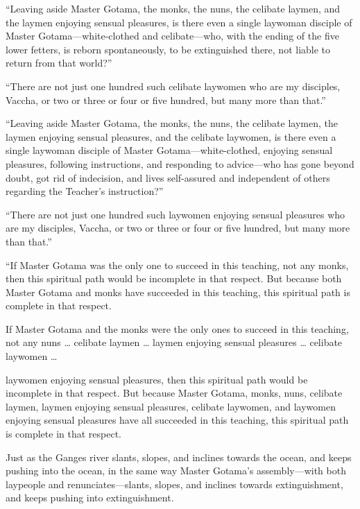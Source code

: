 \documentclass[12pt,openany]{book}%
\begin{document}
“Leaving aside Master Gotama, the monks, the nuns, the celibate laymen, and the laymen enjoying sensual pleasures, is there even a single laywoman disciple of Master Gotama—white-clothed and celibate—who, with the ending of the five lower fetters, is reborn spontaneously, to be extinguished there, not liable to return from that world?” 

“There are not just one hundred such celibate laywomen who are my disciples, Vaccha, or two or three or four or five hundred, but many more than that.” 

“Leaving aside Master Gotama, the monks, the nuns, the celibate laymen, the laymen enjoying sensual pleasures, and the celibate laywomen, is there even a single laywoman disciple of Master Gotama—white-clothed, enjoying sensual pleasures, following instructions, and responding to advice—who has gone beyond doubt, got rid of indecision, and lives self-assured and independent of others regarding the Teacher’s instruction?” 

“There are not just one hundred such laywomen enjoying sensual pleasures who are my disciples, Vaccha, or two or three or four or five hundred, but many more than that.” 

“If Master Gotama was the only one to succeed in this teaching, not any monks, then this spiritual path would be incomplete in that respect. But because both Master Gotama and monks have succeeded in this teaching, this spiritual path is complete in that respect. 

If Master Gotama and the monks were the only ones to succeed in this teaching, not any nuns … celibate laymen … laymen enjoying sensual pleasures … celibate laywomen … 

laywomen enjoying sensual pleasures, then this spiritual path would be incomplete in that respect. But because Master Gotama, monks, nuns, celibate laymen, laymen enjoying sensual pleasures, celibate laywomen, and laywomen enjoying sensual pleasures have all succeeded in this teaching, this spiritual path is complete in that respect. 

Just as the Ganges river slants, slopes, and inclines towards the ocean, and keeps pushing into the ocean, in the same way Master Gotama’s assembly—with both laypeople and renunciates—slants, slopes, and inclines towards extinguishment, and keeps pushing into extinguishment. 
\end{document}
